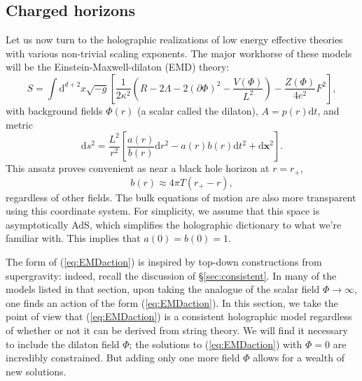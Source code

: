 \documentclass[10pt, oneside]{book}
\begin{document}
\begin{doublespace}
\subsection{Charged horizons}\label{sec:EMD}
Let us now turn to the holographic realizations of low energy effective theories with various non-trivial scaling exponents.    The major workhorse of these models will be the Einstein-Maxwell-dilaton (EMD) theory:  \begin{equation}
S = \int \mathrm{d}^{d+2}x\sqrt{-g} \left[\frac{1}{2\kappa^2}\left(R - 2\Lambda - 2(\partial \Phi)^2 - \frac{V(\Phi)}{L^2}\right) - \frac{Z(\Phi)}{4e^2}F^2\right], \label{eq:EMDaction}
\end{equation}
with background fields $\Phi(r)$ (a scalar called the dilaton), $A=p(r)\mathrm{d}t$, and metric \begin{equation}
\mathrm{d}s^2 = \frac{L^2}{r^2}\left[\frac{a(r)}{b(r)}\mathrm{d}r^2 - a(r)b(r)\mathrm{d}t^2 + \mathrm{d}\mathbf{x}^2\right].  \label{eq:abmetric}
\end{equation}
This ansatz \cite{Lucas:2014sba} proves convenient as near a black hole horizon at $r=r_+$, \begin{equation}
b(r) \approx 4\pi T(r_+-r),   \label{eq:b4pT}
\end{equation}
regardless of other fields.  The bulk equations of motion are also more transparent using this coordinate system.  For simplicity, we assume that this space is asymptotically AdS, which simplifies the holographic dictionary to what we're familiar with.   This implies that $a(0)=b(0)=1$.

The form of (\ref{eq:EMDaction}) is inspired by top-down constructions from supergravity:  indeed, recall the discussion of \S\ref{sec:consistent}.   In many of the models listed in that section,  upon taking the analogue of the scalar field $\Phi \rightarrow \infty$, one finds an action of the form (\ref{eq:EMDaction}).   In this section, we take the point of view that (\ref{eq:EMDaction}) is a consistent holographic model regardless of whether or not it can be derived from string theory.     We will find it necessary to include the dilaton field $\Phi$;  the solutions to (\ref{eq:EMDaction}) with $\Phi=0$ are incredibly constrained.   But adding only one more field $\Phi$ allows for a wealth of new solutions.


\end{doublespace}
\end{document}

